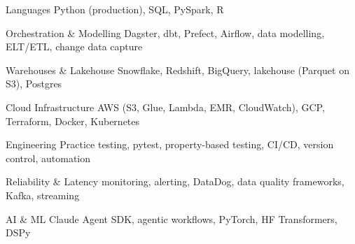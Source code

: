 
\begin{cvskills}

  \cvskill
    {Languages}
    {Python (production), SQL, PySpark, R}

  \cvskill
    {Orchestration \& Modelling}
    {Dagster, dbt, Prefect, Airflow, data modelling, ELT/ETL, change data capture}

  \cvskill
    {Warehouses \& Lakehouse}
    {Snowflake, Redshift, BigQuery, lakehouse (Parquet on S3), Postgres}

  \cvskill
    {Cloud Infrastructure}
    {AWS (S3, Glue, Lambda, EMR, CloudWatch), GCP, Terraform, Docker, Kubernetes}

  \cvskill
    {Engineering Practice}
    {testing, pytest, property-based testing, CI/CD, version control, automation}

  \cvskill
    {Reliability \& Latency}
    {monitoring, alerting, DataDog, data quality frameworks, Kafka, streaming}

  \cvskill
    {AI \& ML}
    {Claude Agent SDK, agentic workflows, PyTorch, HF Transformers, DSPy}

\end{cvskills}
